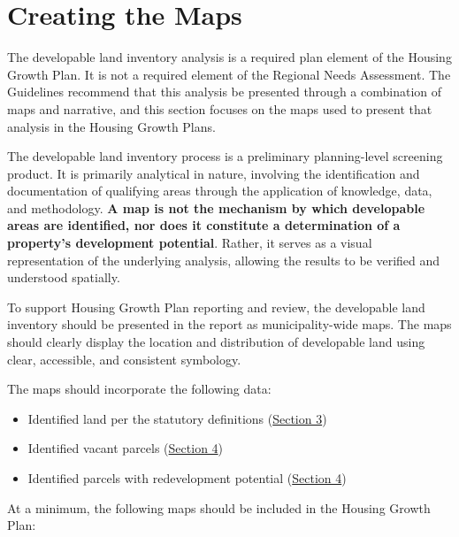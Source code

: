 \documentclass[
  letterpaper,
  DIV=11,
  numbers=noendperiod]{scrreprt}
\providecommand{\tightlist}{%
  \setlength{\itemsep}{0pt}\setlength{\parskip}{0pt}}
\begin{document}

\chapter{Creating the Maps}\label{creating-the-maps}

The developable land inventory analysis is a required plan element of
the Housing Growth Plan. It is not a required element of the Regional
Needs Assessment. The Guidelines recommend that this analysis be
presented through a combination of maps and narrative, and this section
focuses on the maps used to present that analysis in the Housing Growth
Plans.

The developable land inventory process is a preliminary planning-level
screening product. It is primarily analytical in nature, involving the
identification and documentation of qualifying areas through the
application of knowledge, data, and methodology. \textbf{A map is not
the mechanism by which developable areas are identified, nor does it
constitute a determination of a property's development potential}.
Rather, it serves as a visual representation of the underlying analysis,
allowing the results to be verified and understood spatially.

To support Housing Growth Plan reporting and review, the developable
land inventory should be presented in the report as municipality-wide
maps. The maps should clearly display the location and distribution of
developable land using clear, accessible, and consistent symbology.

The maps should incorporate the following data:

\begin{itemize}
\tightlist
\item
  Identified land per the statutory definitions
  (\hyperref[sec-statutory-exclusions]{Section 3})
\item
  Identified vacant parcels
  (\hyperref[identifying-vacant-and-potential-land-for-redevelopment]{Section
  4})
\item
  Identified parcels with redevelopment potential
  (\hyperref[identifying-vacant-and-potential-land-for-redevelopment]{Section
  4})
\end{itemize}

At a minimum, the following maps should be included in the Housing
Growth Plan:
\end{document}
